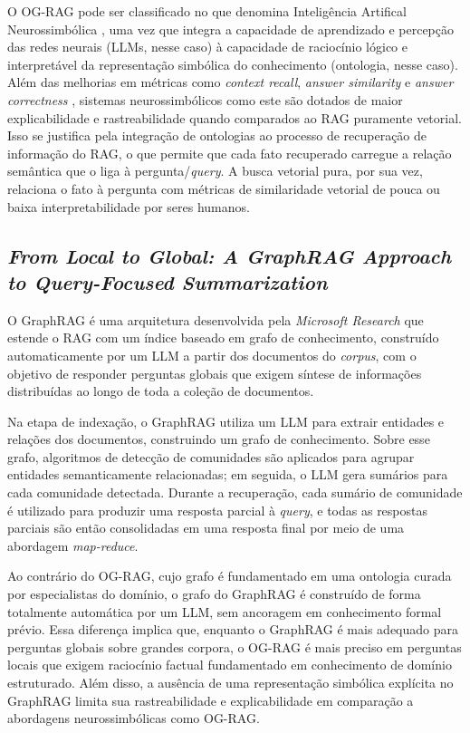 \documentclass{article}
\begin{document}
O OG-RAG pode ser classificado no que denomina Inteligência Artifical Neurossimbólica \cite{shakarian2023neurosymbolic}, uma vez que integra a capacidade de aprendizado e percepção das redes neurais (LLMs, nesse caso) à capacidade de raciocínio lógico e interpretável da representação simbólica do conhecimento (ontologia, nesse caso). Além das melhorias em métricas como \textit{context recall}, \textit{answer similarity} e \textit{answer correctness} \cite{es-etal-2024-ragas}, sistemas neurossimbólicos como este são dotados de maior explicabilidade e rastreabilidade quando comparados ao RAG puramente vetorial. Isso se justifica pela integração de ontologias ao processo de recuperação de informação do RAG, o que permite que cada fato recuperado carregue a relação semântica que o liga à pergunta/\textit{query}. A busca vetorial pura, por sua vez, relaciona o fato à pergunta com métricas de similaridade vetorial de pouca ou baixa interpretabilidade por seres humanos.


\subsection{\textit{From Local to Global: A GraphRAG Approach to Query-Focused Summarization}}

O GraphRAG \cite{edge2024graphrag} é uma arquitetura desenvolvida pela
\textit{Microsoft Research} que estende o RAG com um índice baseado em grafo de conhecimento, construído automaticamente por um LLM a partir dos documentos do \textit{corpus}, com o objetivo de responder perguntas globais que exigem síntese de informações distribuídas ao longo de toda a coleção de
documentos.

Na etapa de indexação, o GraphRAG utiliza um LLM para extrair entidades e relações dos documentos, construindo um grafo de conhecimento. Sobre esse grafo, algoritmos de detecção de comunidades são aplicados para agrupar entidades semanticamente relacionadas; em seguida, o LLM gera sumários
para cada comunidade detectada. Durante a recuperação, cada sumário de comunidade é utilizado para produzir uma resposta parcial à \textit{query}, e todas as respostas parciais são então consolidadas em uma resposta final por meio de uma abordagem \textit{map-reduce}.

Ao contrário do OG-RAG, cujo grafo é fundamentado em uma ontologia curada por especialistas do domínio, o grafo do GraphRAG é construído de forma totalmente automática por um LLM, sem ancoragem em conhecimento formal prévio. Essa diferença implica que, enquanto o GraphRAG é mais
adequado para perguntas globais sobre grandes corpora, o OG-RAG é mais preciso em perguntas locais que exigem raciocínio factual fundamentado em conhecimento de domínio estruturado. Além disso, a ausência de uma
representação simbólica explícita no GraphRAG limita sua rastreabilidade e explicabilidade em comparação a abordagens neurossimbólicas como OG-RAG.
\end{document}
